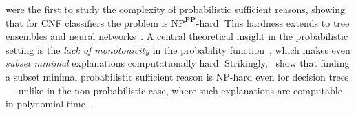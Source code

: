 \documentclass{article}
\begin{document}

\cite{waldchen2021computational} were the first to study the complexity of probabilistic sufficient reasons, showing that for CNF classifiers the problem is $\text{NP}^{\textbf{PP}}$-hard. This hardness extends to tree ensembles and neural networks~\citep{BaMoPeSu20, ordyniak2023parameterized}. A central theoretical insight in the probabilistic setting is the \emph{lack of monotonicity} in the probability function~\citep{arenas2022computing, izza2023computing}, which makes even \emph{subset minimal} explanations computationally hard. Strikingly,~\citep{arenas2022computing} show that finding a subset minimal probabilistic sufficient reason is NP-hard even for decision trees --- unlike in the non-probabilistic case, where such explanations are computable in polynomial time~\citep{huang2021efficiently, BaMoPeSu20}.

\end{document}
